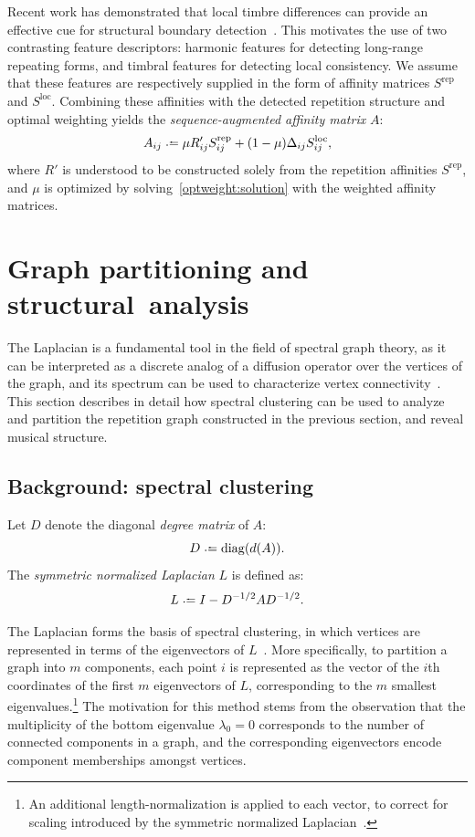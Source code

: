 \documentclass{article}
\begin{document}
Recent work has demonstrated that local timbre differences 
can provide an effective cue for structural boundary
detection~\cite{kaiser2013simple}.  This motivates the use of two contrasting feature
descriptors: harmonic features for detecting long-range repeating forms, and timbral
features for detecting local consistency.  We assume that these features are
respectively supplied in the form of affinity matrices $S^\text{rep}$ and
$S^\text{loc}$.  Combining these affinities with the detected repetition structure and
optimal weighting yields the \emph{sequence-augmented affinity matrix} $A$:
\begin{equation}
A_{ij} \defeq \mu R'_{ij} S^\text{rep}_{ij} + (1-\mu) \Delta_{ij} S^\text{loc}_{ij},\label{saam}
\end{equation}
where $R'$ is understood to be
constructed solely from the repetition affinities $S^\text{rep}$, and $\mu$ is
optimized by solving~\eqref{optweight:solution} with the weighted affinity matrices.


\section{Graph partitioning and structural~analysis}

The Laplacian is a fundamental tool in the field of spectral graph
theory, as it can be interpreted as a discrete analog of a diffusion operator over the
vertices of the graph, and its spectrum can be used to characterize 
vertex connectivity~\cite{chung1997spectral}.  This section describes in detail
how spectral clustering can be used to analyze and partition the repetition graph 
constructed in the previous section, and reveal musical structure.

\subsection{Background: spectral clustering}
Let $D$ denote the diagonal \emph{degree matrix} of $A$: 
$${D \defeq \diag(d(A))}.$$
The \emph{symmetric normalized Laplacian} $L$ is defined as:
\begin{equation}
L \defeq I - D^{-1/2} A D^{-1/2}.\label{symlaplacian}
\end{equation}

The Laplacian forms the basis of spectral clustering, in which vertices are
represented in terms of the eigenvectors of $L$~\cite{von2007tutorial}.  More
specifically, to partition a graph into $m$ components, each point $i$ is represented as
the vector of the $i$th coordinates of the first $m$ eigenvectors of $L$,
corresponding to the $m$ smallest eigenvalues.\footnote{An additional
length-normalization is applied to each vector, to correct for scaling introduced by
the symmetric normalized Laplacian~\cite{von2007tutorial}.}
The motivation for this method stems from the observation that the multiplicity of the 
bottom eigenvalue $\lambda_0 = 0$ corresponds to the number of connected components in a
graph, and the corresponding eigenvectors encode component memberships amongst vertices.
\end{document}
